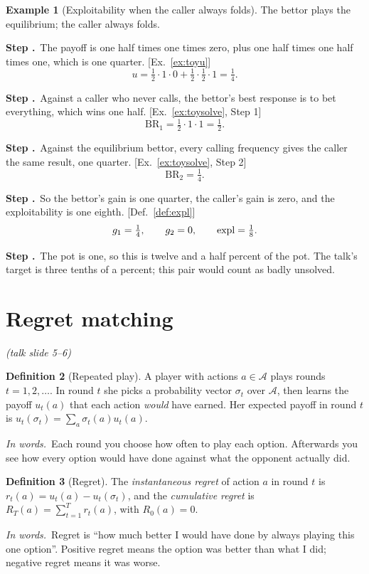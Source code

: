 \documentclass[11pt]{article}
\theoremstyle{definition}
\newtheorem{definition}{Definition}[section]
\newtheorem{example}[definition]{Example}
\newcommand{\inwords}{\par\smallskip\noindent\textit{In words.}\ }
\newcounter{stp}
\newcommand{\steps}{\setcounter{stp}{0}}
\newcommand{\st}{\stepcounter{stp}\par\medskip\noindent\textbf{Step \arabic{stp}.}\ }
\newcommand{\by}[1]{\hfill{\small\color{blue!50!black}[#1]}}
\newcommand{\Def}[1]{Def.~\ref{#1}}\newcommand{\Lem}[1]{Lemma~\ref{#1}}\newcommand{\Thm}[1]{Thm.~\ref{#1}}
\newcommand{\Ex}[1]{Ex.~\ref{#1}}\newcommand{\Rem}[1]{Remark~\ref{#1}}\newcommand{\Alg}[1]{Alg.~\ref{#1}}\newcommand{\Cor}[1]{Cor.~\ref{#1}}
\newcommand{\slide}[1]{\hfill{\small\itshape (talk slide #1)}}
\begin{document}
\begin{example}[Exploitability when the caller always folds]\label{ex:toyfold}
The bettor plays the equilibrium; the caller always folds.
\steps
\st The payoff is one half times one times zero, plus one half times one half times one, which is one quarter.
\by{\Ex{ex:toyu}}
\[ u=\tfrac12\cdot1\cdot0+\tfrac12\cdot\tfrac12\cdot1=\tfrac14. \]
\st Against a caller who never calls, the bettor's best response is to bet everything, which wins one half.
\by{\Ex{ex:toysolve}, Step 1}
\[ \mathrm{BR}_1=\tfrac12\cdot1\cdot1=\tfrac12. \]
\st Against the equilibrium bettor, every calling frequency gives the caller the same result, one quarter.
\by{\Ex{ex:toysolve}, Step 2}
\[ \mathrm{BR}_2=\tfrac14. \]
\st So the bettor's gain is one quarter, the caller's gain is zero, and the exploitability is one eighth. \by{\Def{def:expl}}
\[ g_1=\tfrac14,\qquad g_2=0,\qquad\mathrm{expl}=\tfrac18. \]
\st The pot is one, so this is twelve and a half percent of the pot. The talk's target is three tenths of a percent; this
pair would count as badly unsolved.
\end{example}
\section{Regret matching}\label{sec:rm}\slide{5--6}
\begin{definition}[Repeated play]\label{def:repeat}
A player with actions $a\in\mathcal A$ plays rounds $t=1,2,\dots$. In round $t$ she picks a probability vector $\sigma_t$
over $\mathcal A$, then learns the payoff $u_t(a)$ that each action \emph{would} have earned. Her expected payoff in
round $t$ is $u_t(\sigma_t)=\sum_a\sigma_t(a)u_t(a)$.
\inwords Each round you choose how often to play each option. Afterwards you see how every option would have done
against what the opponent actually did.
\end{definition}

\begin{definition}[Regret]\label{def:regret}
The \emph{instantaneous regret} of action $a$ in round $t$ is $r_t(a)=u_t(a)-u_t(\sigma_t)$, and the \emph{cumulative regret}
is $R_T(a)=\sum_{t=1}^Tr_t(a)$, with $R_0(a)=0$.
\inwords Regret is ``how much better I would have done by always playing this one option''. Positive regret means the
option was better than what I did; negative regret means it was worse.
\end{definition}
\end{document}
